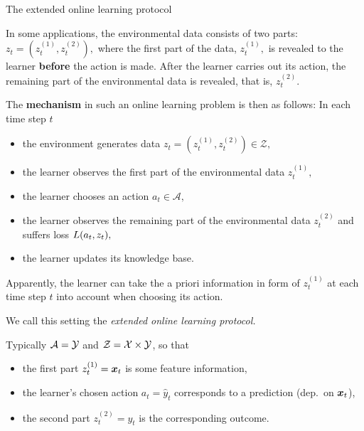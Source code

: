 \begin{frame}{The extended online learning protocol}
\footnotesize
\begin{itemize}
	 \item In some applications, the environmental data consists of two parts: $z_{t} = (z_{t}^{(1)}, z_{t}^{(2)}),$ where the first part of the data, $z_{t}^{(1)},$ is revealed to the learner \textbf{before} the action is made.
	After the learner carries out its action, the remaining part of the environmental data is revealed, that is, $z_{t}^{(2)}.$
	{ {  \item The \textbf{mechanism} in such an online learning problem is then as follows: In each time step $t$
	\begin{itemize}\footnotesize
		 \item the environment generates data $z_{t} = (z_{t}^{(1)}, z_{t}^{(2)}) \in \mathcal{Z},$
		 \item the learner observes the first part of the environmental data $ z_{t}^{(1)},$
		 \item the learner chooses an action $a_{t} \in \mathcal{A},$  
		 \item the learner observes the remaining part of the environmental data $z_{t}^{(2)}$ and suffers loss $L(a_{t},z_{t}),$ 
		 \item the learner updates its knowledge base.
	\end{itemize} }}
	{ {  \item Apparently, the learner can  take the a priori information in form of $ z_{t}^{(1)}$ at each time step $t$ into account when choosing its action. }}
	{ {  \item We call this setting the \emph{extended online learning protocol.}	}}
%	 
	 { { \item 	Typically $\mathcal{A} = \mathcal{Y}$ and  $ \mathcal{Z} = \mathcal{X} \times \mathcal{Y}$, so that
	 		\begin{itemize}\footnotesize
	 			\item the first part $z_{t}^{(1)} = \bm{x}_t$ is some feature information,
	 			\item the learner's chosen action $a_{t} = \hat{y}_t$ corresponds to a prediction (dep.\ on $\bm{x}_t$),
%	 			
				\item the second part $z_{t}^{(2)} =y_t$ is the corresponding outcome.
%	 			
	 \end{itemize}}}	
\end{itemize}
%
\end{frame}


